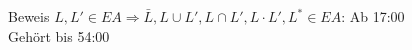 \documentclass{article}
\begin{document}
Beweis $L, L' \in EA \Rightarrow \bar{L}, L \cup L', L \cap L', L \cdot L', L^* \in EA$:
Ab 17:00  \\
Gehört bis 54:00
\end{document}

